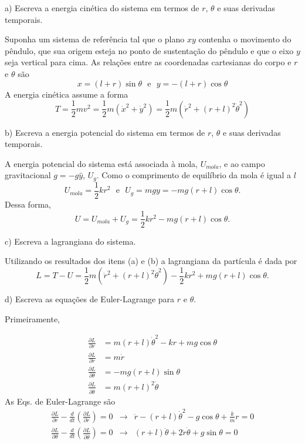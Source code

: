 \begin{enumerate}[start=1,label={\bfseries Q\arabic*.}]
a) Escreva a energia cinética do sistema em termos de $r$, $\theta$ e suas derivadas temporais.

\resposta Suponha um sistema de referência tal que o plano $xy$ contenha o movimento do pêndulo, que sua origem esteja no ponto de sustentação do pêndulo e que o eixo $y$ seja vertical para cima. As relações entre as coordenadas cartesianas do corpo e $r$ e $\theta$ são
$$
x=(l+r) \sin \theta \ \ \ \mbox{e} \ \ \ y=-(l+r) \cos \theta
$$
A energia cinética assume a forma
$$
T=\frac{1}{2} m v^{2}=\frac{1}{2} m\left(\dot{x}^{2}+\dot{y}^{2}\right)=\frac{1}{2} m\left(\dot{r}^{2}+(r+l)^{2} \dot{\theta}^{2}\right)
$$

b) Escreva a energia potencial do sistema em termos de $r$, $\theta$ e suas derivadas temporais.

\resposta A energia potencial do sistema está associada à mola, $U_{mola}$, e ao campo gravitacional $g = - g \hat{y}$, $U_{g}$. Como o comprimento de equilíbrio da mola é igual a $l$
$$
U_{mola} = \frac{1}{2} kr^{2} \  \  \  \mbox{e} \  \  \ U_{g} = mgy = - mg(r+l)\cos \theta.
$$
Dessa forma,
$$
U = U_{mola} + U_{g} = \frac{1}{2} kr^{2} - mg(r+l)\cos \theta.
$$


c) Escreva a lagrangiana do sistema.

\resposta  Utilizando os resultados dos itens (a) e (b) a lagrangiana da partícula é dada por
$$
L = T - U = \frac{1}{2}m \left( \dot{r}^{2} + (r+l)^{2} \dot{\theta}^{2} \right) - \frac{1}{2} kr^{2} + mg(r+l)\cos \theta.
$$



d) Escreva as equações de Euler-Lagrange para $r$ e $\theta$.

\resposta Primeiramente,

$$
\begin{aligned}
\frac{\partial L}{\partial r} &=m(r+l) \dot{\theta}^{2}-k r+m g \cos \theta \\
\frac{\partial L}{\partial \dot{r}} &=m \dot{r} \\
\frac{\partial L}{\partial \theta} &=-m g(r+l) \sin \theta \\
\frac{\partial L}{\partial \dot{\theta}} &=m(r+l)^{2} \dot{\theta}
\end{aligned}
$$
As Eqs. de Euler-Lagrange são
\begin{align}\label{euler-lagrange}
\frac{\partial L}{\partial r}-\frac{d}{d t}\left(\frac{\partial L}{\partial \dot{r}}\right) = 0 & \rightarrow & \ddot{r}-(r+l) \dot{\theta}^{2}-g \cos \theta+\frac{k}{m} r = 0 \\
\frac{\partial L}{\partial \theta}-\frac{d}{d t}\left(\frac{\partial L}{\partial \dot{\theta}}\right) =  0 & \rightarrow & (r+l) \ddot{\theta}+2 \dot{r} \dot{\theta}+g \sin \theta = 0
\end{align}


\end{enumerate}
